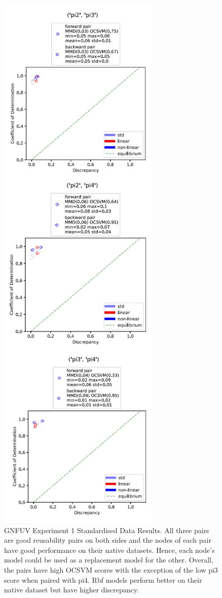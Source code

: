 \documentclass{mpaper}
\begin{document}
\begin{figure}
    \centering
    \includegraphics[scale = 0.7]{experiment_1_std.jpg}
    \caption{GNFUV Experiment 1 Standardised Data Results. All three pairs are good reusability pairs on both sides and the nodes of each pair have good performance on their native datasets. Hence, each node's model could be used as a replacement model for the other. Overall, the pairs have high OCSVM scores with the exception of the low pi3 score when paired with pi4. Rbf models perform better on their native dataset but have higher discrepancy.}
    \label{fig:gnfuv_exp1_std}
\end{figure}
\end{document}
